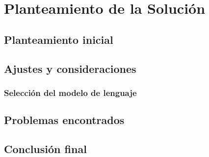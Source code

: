 \chapter{Planteamiento de la Solución}
\label{cap:planteamiento}
\section{Planteamiento inicial}

\section{Ajustes y consideraciones}

\subsection{Selección del modelo de lenguaje}


\section{Problemas encontrados}

\section{Conclusión final}
